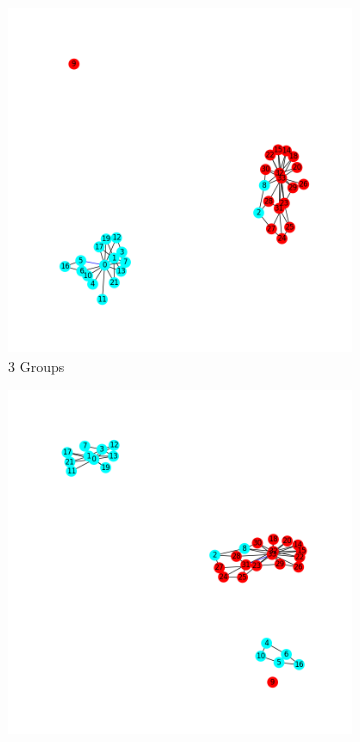 \documentclass[11pt]{article} %
\begin{document}
\begin{figure}[h!]
  \centering
  \begin{subfigure}[b]{0.5\linewidth}
    \includegraphics[width=\linewidth]{../Figures/3_communities.png}
    \caption{3 Groups}
  \end{subfigure}
\begin{subfigure}[b]{0.5\linewidth}
    \includegraphics[width=\linewidth]{../Figures/4_communities.png}

\end{subfigure}
\end{figure}
\end{document}
